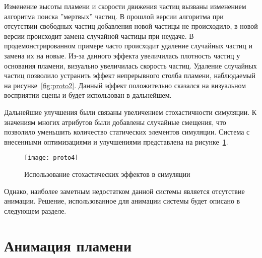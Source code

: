 Изменение высоты пламени и скорости движения частиц вызваны изменением алгоритма
поиска ''мертвых'' частиц. В прошлой версии алгоритма при отсутствии свободных
частиц добавления новой частицы не происходило, в новой версии происходит замена
случайной частицы при неудаче. В продемонстрированном примере часто происходит
удаление случайных частиц и замена их на новые. Из-за данного эффекта
увеличилась плотность частиц у основания пламени, визуально увеличилась скорость
частиц. Удаление случайных частиц позволило устранить эффект непрерывного столба
пламени, наблюдаемый на рисунке~\ref{fig:proto2}. Данный эффект положительно
сказался на визуальном восприятии сцены и будет использован в дальнейшем.

Дальнейшие улучшения были связаны увеличением стохастичности симуляции. К
значениям многих атрибутов были добавлены случайные смещения, что позволило
уменьшить количество статических элементов симуляции. Система с внесенными
оптимизациями и улучшениями представлена на рисунке~\ref{fig:proto4}.
\begin{figure}[htb]
	\centering
    \texttt{[image: proto4]}
    \caption{Использование стохастических эффектов в симуляции}%
    \label{fig:proto4}
\end{figure}
Однако, наиболее заметным недостатком данной системы является отсутствие
анимации. Решение, использованное для анимации системы будет описано в следующем
разделе.

\section{Анимация пламени}

